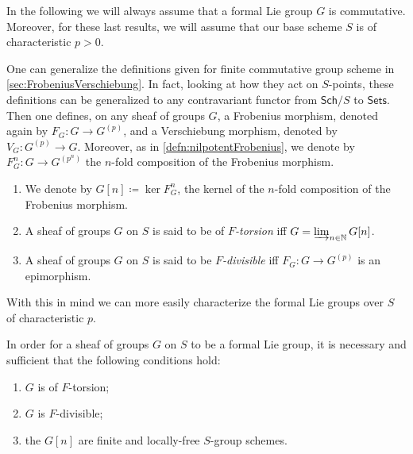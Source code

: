\noindent
In the following we will always assume that a formal Lie group $G$
is commutative.
Moreover, for these last results, we will assume that
our base scheme $S$ is of characteristic $p  > 0$.


\begin{rem}
One can generalize the definitions given for finite commutative group scheme
in \cref{sec:FrobeniusVerschiebung}.
In fact, looking at how they act on $S$-points, these
definitions can be generalized to any contravariant functor
from $\mathsf{Sch}/S$ to $\mathsf{Sets}$.
Then one defines, on any sheaf of groups $G$, a Frobenius morphism,
denoted again by $F_G\colon G \to G^{(p)}$, 
and a Verschiebung morphism, denoted by $V_G \colon G^{(p)} \to G$.
Moreover, as in \cref{defn:nilpotentFrobenius}, we denote by
$F^n_G\colon G \to G^{(p^n)}$ the $n$-fold composition
of the Frobenius morphism.
\end{rem}


\begin{defn}[]\leavevmode\vspace{-\baselineskip}
\begin{enumerate}
\item We denote by $G[n] \coloneqq \ker F^n_G$, the kernel of the $n$-fold composition
	of the Frobenius morphism.

\item A sheaf of groups $G$ on $S$ is said to be of \emph{$F$-torsion} iff
	$G = \varinjlim_{n \in \mathbb{N}} G[n]$.

\item A sheaf of groups $G$ on $S$ is said to be \emph{$F$-divisible} iff
	$F_G\colon G \to G^{(p)}$ is an epimorphism.
\end{enumerate}
\end{defn}


\noindent
With this in mind we can more easily characterize the formal Lie groups over
$S$ of characteristic $p$.
\begin{thm}\label{thm:MessingCharactLieGroup}
	In order for a sheaf of groups $G$ on $S$ to be a formal Lie group,
	it is necessary and sufficient that the following conditions hold:
\begin{enumerate}
	\item $G$ is of $F$-torsion;
	\item $G$ is $F$-divisible;
	\item the $G[n]$ are finite and locally-free $S$-group schemes.
\end{enumerate}
\end{thm}


